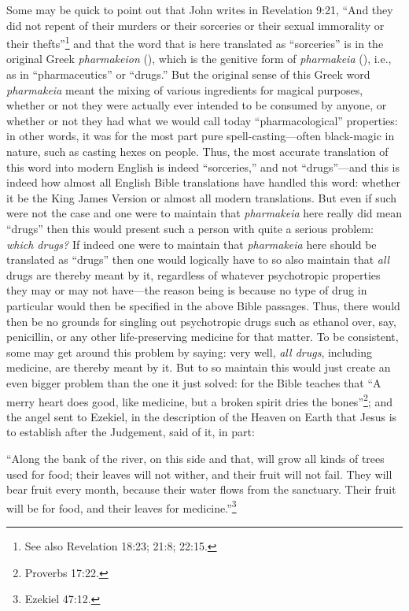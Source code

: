 \documentclass[letterpaper,12pt]{article}
\newenvironment{squote}
  {\small\quote}
  {\endquote\normalsize}
\begin{document}
Some may be quick to point out that John writes in Revelation 9:21, ``And they did not repent of their murders or their sorceries or their sexual immorality or their thefts''\footnote{See also Revelation 18:23; 21:8; 22:15.} and that the word that is here translated as ``sorceries'' is in the original Greek \emph{pharmakeion} (), which is the genitive form of \emph{pharmakeia} (), i.e., as in ``pharmaceutics'' or ``drugs.'' But the original sense of this Greek word \emph{pharmakeia} meant the mixing of various ingredients for magical purposes, whether or not they were actually ever intended to be consumed by anyone, or whether or not they had what we would call today ``pharmacological'' properties: in other words, it was for the most part pure spell-casting---often black-magic in nature, such as casting hexes on people. Thus, the most accurate translation of this word into modern English is indeed ``sorceries,'' and not ``drugs''---and this is indeed how almost all English Bible translations have handled this word: whether it be the King James Version or almost all modern translations. But even if such were not the case and one were to maintain that \emph{pharmakeia} here really did mean ``drugs'' then this would present such a person with quite a serious problem: \emph{which drugs?} If indeed one were to maintain that \emph{pharmakeia} here should be translated as ``drugs'' then one would logically have to so also maintain that \emph{all} drugs are thereby meant by it, regardless of whatever psychotropic properties they may or may not have---the reason being is because no type of drug in particular would then be specified in the above Bible passages. Thus, there would then be no grounds for singling out psychotropic drugs such as ethanol over, say, penicillin, or any other life-preserving medicine for that matter. To be consistent, some may get around this problem by saying: very well, \emph{all drugs}, including medicine, are thereby meant by it. But to so maintain this would just create an even bigger problem than the one it just solved: for the Bible teaches that ``A merry heart does good, like medicine, but a broken spirit dries the bones''\footnote{Proverbs 17:22.}; and the angel sent to Ezekiel, in the description of the Heaven on Earth that Jesus is to establish after the Judgement, said of it, in part:

\begin{squote}
``Along the bank of the river, on this side and that, will grow all kinds of trees used for food; their leaves will not wither, and their fruit will not fail. They will bear fruit every month, because their water flows from the sanctuary. Their fruit will be for food, and their leaves for medicine.''\footnote{Ezekiel 47:12.}
\end{squote}
\end{document}

